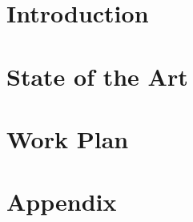 \documentclass[twoside,openright,titlepage,numbers=noenddot,headinclude,
               footinclude=true,cleardoublepage=empty,abstractoff,
               BCOR=5mm,paper=a4,fontsize=11pt,ngerman,american,]{scrreprt}
\begin{document}
\frenchspacing
\raggedbottom
{}
\pagestyle{plain}



\pagestyle{scrheadings}



\cleardoublepage
\ctparttext{}
\part{Introduction}




\cleardoublepage
\ctparttext{}
\part{State of the Art}







\cleardoublepage
\ctparttext{}
\part{Work Plan}

% 
% 
% 
% 
% 
% 
\appendix
\cleardoublepage
\part{Appendix}


% 
\end{document}
